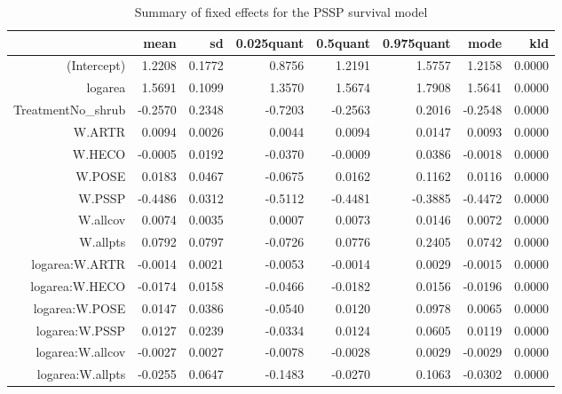 \documentclass[11pt]{article}
\begin{document}
\begin{table}[ht]
\centering
\caption{Summary of fixed effects for the PSSP survival model} 
\label{PSSPsurvival}
\begin{tabular}{rrrrrrrr}
  \hline
 & mean & sd & 0.025quant & 0.5quant & 0.975quant & mode & kld \\ 
  \hline
(Intercept) & 1.2208 & 0.1772 & 0.8756 & 1.2191 & 1.5757 & 1.2158 & 0.0000 \\ 
  logarea & 1.5691 & 0.1099 & 1.3570 & 1.5674 & 1.7908 & 1.5641 & 0.0000 \\ 
  TreatmentNo\_shrub & -0.2570 & 0.2348 & -0.7203 & -0.2563 & 0.2016 & -0.2548 & 0.0000 \\ 
  W.ARTR & 0.0094 & 0.0026 & 0.0044 & 0.0094 & 0.0147 & 0.0093 & 0.0000 \\ 
  W.HECO & -0.0005 & 0.0192 & -0.0370 & -0.0009 & 0.0386 & -0.0018 & 0.0000 \\ 
  W.POSE & 0.0183 & 0.0467 & -0.0675 & 0.0162 & 0.1162 & 0.0116 & 0.0000 \\ 
  W.PSSP & -0.4486 & 0.0312 & -0.5112 & -0.4481 & -0.3885 & -0.4472 & 0.0000 \\ 
  W.allcov & 0.0074 & 0.0035 & 0.0007 & 0.0073 & 0.0146 & 0.0072 & 0.0000 \\ 
  W.allpts & 0.0792 & 0.0797 & -0.0726 & 0.0776 & 0.2405 & 0.0742 & 0.0000 \\ 
  logarea:W.ARTR & -0.0014 & 0.0021 & -0.0053 & -0.0014 & 0.0029 & -0.0015 & 0.0000 \\ 
  logarea:W.HECO & -0.0174 & 0.0158 & -0.0466 & -0.0182 & 0.0156 & -0.0196 & 0.0000 \\ 
  logarea:W.POSE & 0.0147 & 0.0386 & -0.0540 & 0.0120 & 0.0978 & 0.0065 & 0.0000 \\ 
  logarea:W.PSSP & 0.0127 & 0.0239 & -0.0334 & 0.0124 & 0.0605 & 0.0119 & 0.0000 \\ 
  logarea:W.allcov & -0.0027 & 0.0027 & -0.0078 & -0.0028 & 0.0029 & -0.0029 & 0.0000 \\ 
  logarea:W.allpts & -0.0255 & 0.0647 & -0.1483 & -0.0270 & 0.1063 & -0.0302 & 0.0000 \\ 
   \hline
\end{tabular}
\end{table}
\end{document}
